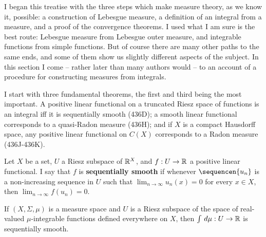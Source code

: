       
\def\chaptername{Topologies and measures II} 
\def\sectionname{Representation of linear functionals} 
      
      
I began this treatise with the three steps which make measure theory, as 
we know it, possible:  a construction of Lebesgue measure, a 
definition of an integral from a measure, and a proof of the 
convergence theorems.   I used what I am sure is the best route: 
Lebesgue measure from Lebesgue 
outer measure, and integrable functions from simple functions.   But of 
course there are many other paths to the same ends, and some of them 
show us slightly different aspects of the subject.   In this section I 
come -- rather later than many authors would -- to an account of a 
procedure for constructing measures from integrals. 
      
I start with three fundamental theorems, the first and third being the 
most important.   A positive linear functional on a truncated Riesz 
space of functions is an integral iff it is sequentially smooth (436D); 
a smooth linear functional corresponds to a quasi-Radon measure (436H); 
and if $X$ is a compact Hausdorff space, any positive linear functional 
on $C(X)$ corresponds to a Radon measure (436J-436K). 
      
 Let $X$ be a set, $U$ a Riesz subspace of 
$\Bbb R^X$, and $f:U\to\Bbb R$ a positive linear functional.   I say 
that $f$ is {\bf sequentially smooth} if whenever $\sequencen{u_n}$ is a 
non-increasing sequence in $U$ such that $\lim_{n\to\infty}u_n(x)=0$ for 
every $x\in X$, then $\lim_{n\to\infty}f(u_n)=0$. 
      
If $(X,\Sigma,\mu)$ is a measure space and $U$ is a Riesz subspace of 
the space of real-valued $\mu$-integrable functions defined everywhere 
on $X$, then $\int\,d\mu:U\to\Bbb R$ is sequentially smooth. 
      
      
